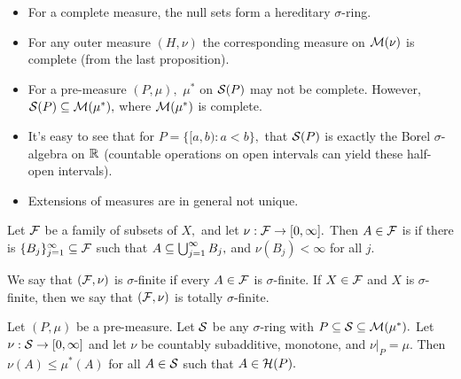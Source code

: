 \begin{itemize}
\item For a complete measure, the null sets form a hereditary $\sigma$-ring.
\item For any outer measure $(H,\nu)$ the corresponding measure on $\mathcal{M}(\nu)$ is complete (from the last proposition).
\item For a pre-measure $(P,\mu),$ $\mu^*$ on $\mathcal{S}(P)$ may not be complete. However, $\mathcal{S}(P)\subseteq\mathcal{M}(\mu^*),$ where $\mathcal{M}(\mu^*)$ is complete.
\item It's easy to see that for $P=\{[a,b): a<b\},$ that $\mathcal{S}(P)$ is exactly the Borel $\sigma$-algebra on $\mathbb{R}^{}$ (countable operations on open intervals can yield these half-open intervals).
\item Extensions of measures are in general not unique. 
\end{itemize}

\begin{defn}
Let $\mathcal{F}$ be a family of subsets of $X,$ and let $\nu:\mathcal{F}\rightarrow[0,\infty].$ Then $A\in\mathcal{F}$ is  if there is $\{B_j\}_{j=1}^{\infty}\subseteq\mathcal{F}$ such that $A\subseteq\bigcup_{j=1}^{\infty} B_j,$ and $\nu(B_j)<\infty$ for all $j.$
\end{defn}

\noindent We say that $(\mathcal{F},\nu)$ is $\sigma$-finite if every $A\in\mathcal{F}$ is $\sigma$-finite. If $X\in\mathcal{F}$ and $X$ is $\sigma$-finite, then we say that $(\mathcal{F},\nu)$ is totally $\sigma$-finite.

\begin{lemma}
Let $(P,\mu)$ be a pre-measure. Let $\mathcal{S}$ be any $\sigma$-ring with $P\subseteq\mathcal{S}\subseteq\mathcal{M}(\mu^*).$ Let $\nu:\mathcal{S}\rightarrow[0,\infty]$ and let $\nu$ be countably subadditive, monotone, and $\nu|_P=\mu.$ Then $\nu(A)\leq\mu^*(A)$ for all $A\in\mathcal{S}$ such that $A\in\mathcal{H}(P).$ \\ \\
\end{lemma}

